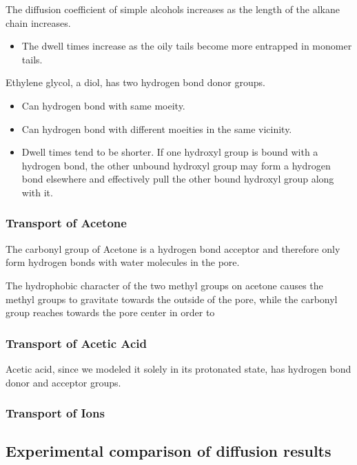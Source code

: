\documentclass{article}
\begin{document}
  The diffusion coefficient of simple alcohols increases as the length of 
  the alkane chain increases.
  \begin{itemize}
	\item The dwell times increase as the oily tails become more
	entrapped in monomer tails.
  \end{itemize}

  Ethylene glycol, a diol, has two hydrogen bond donor groups.
  \begin{itemize}
	\item Can hydrogen bond with same moeity.
	\item Can hydrogen bond with different moeities in the same 
	vicinity. 
	\item Dwell times tend to be shorter. If one hydroxyl group is bound
	with a hydrogen bond, the other unbound hydroxyl group may form a hydrogen bond
	elsewhere and effectively pull the other bound hydroxyl group along with it. 
  \end{itemize}

  \subsubsection*{Transport of Acetone}

  The carbonyl group of Acetone is a hydrogen bond acceptor and therefore only
  form hydrogen bonds with water molecules in the pore. 

  The hydrophobic character of the two methyl groups on acetone causes the methyl
  groups to gravitate towards the outside of the pore, while the carbonyl group
  reaches towards the pore center in order to 

  \subsubsection*{Transport of Acetic Acid}

  Acetic acid, since we modeled it solely in its protonated state, has hydrogen
  bond donor and acceptor groups. 

  \subsubsection*{Transport of Ions} %

  \subsection{Experimental comparison of diffusion results}
\end{document}
